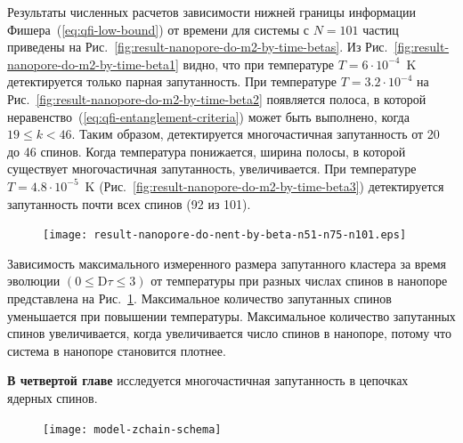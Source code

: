Результаты численных расчетов зависимости нижней границы информации Фишера~(\ref{eq:qfi-low-bound}) от времени для системы с $N=101$ частиц приведены на Рис.~\ref{fig:result-nanopore-do-m2-by-time-betas}.
Из Рис.~\ref{fig:result-nanopore-do-m2-by-time-beta1} видно,
что при температуре $T=6\cdot10^{-4}$~K детектируется только парная запутанность.
При температуре $T=3.2\cdot10^{-4}$ на Рис.~\ref{fig:result-nanopore-do-m2-by-time-beta2} появляется полоса, в которой неравенство~(\ref{eq:qfi-entanglement-criteria}) может быть выполнено, когда $19 \leq k < 46$.
Таким образом, детектируется многочастичная запутанность от 20 до 46 спинов.
Когда температура понижается, ширина полосы, в которой существует многочастичная запутанность, увеличивается.
При температуре $T=4.8\cdot10^{-5}$~K (Рис.~\ref{fig:result-nanopore-do-m2-by-time-beta3}) детектируется запутанность почти всех спинов (92 из 101).

\begin{figure}[H]
 	\texttt{[image: result-nanopore-do-nent-by-beta-n51-n75-n101.eps]}
	\caption{\protect}
	\label{fig:result-nanopore-do-nent-by-beta-n51-n75-n101}
\end{figure}

Зависимость максимального измеренного размера запутанного кластера за время эволюции $({0}\leq \mathrm{D}\tau\leq{3})$ от температуры при разных числах спинов в нанопоре представлена на Рис.~\ref{fig:result-nanopore-do-nent-by-beta-n51-n75-n101}.
Максимальное количество запутанных спинов уменьшается при повышении температуры.
Максимальное количество запутанных спинов увеличивается, когда увеличивается число спинов в нанопоре, потому что система в нанопоре становится плотнее.


\textbf{В четвертой главе} исследуется многочастичная запутанность в цепочках ядерных спинов.

\begin{figure}
  \texttt{[image: model-zchain-schema]}
  \caption{\protect}
  \label{fig:model-zchain-schema}
\end{figure}

